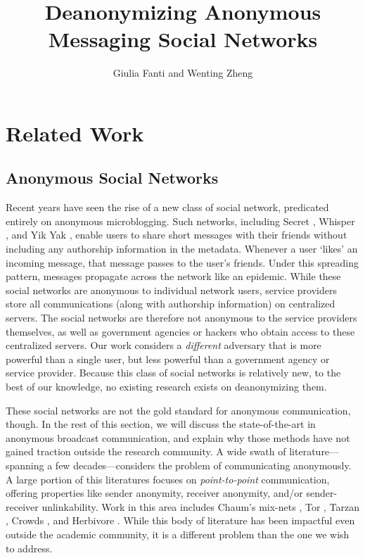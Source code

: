 \documentclass[10pt, twocolumn]{article}
\begin{document}
\title{Deanonymizing Anonymous Messaging Social Networks}

\author{Giulia Fanti and Wenting Zheng}

   \date{}
   \maketitle
   \thispagestyle{empty}
\section{Related Work}

\subsection{Anonymous Social Networks} 
Recent years have seen the rise of a new class of social network, predicated entirely on anonymous microblogging.
Such networks, including Secret \cite{secret}, Whisper \cite{whisper}, and Yik Yak \cite{yikyak}, enable users to share short messages with their friends without including any authorship information in the metadata. 
Whenever a user `likes' an incoming message, that message passes to the user's friends.
Under this spreading pattern, messages propagate across the network like an epidemic.
While these social networks are anonymous to individual network users, service providers store all communications (along with authorship information) on centralized servers.
The social networks are therefore not anonymous to the service providers themselves, as well as government agencies or hackers who obtain access to these centralized servers.
Our work considers a \emph{different} adversary that is more powerful than a single user, but less powerful than a government agency or service provider.
Because this class of social networks is relatively new, to the best of our knowledge, no existing research exists on deanonymizing them.

These social networks are not the gold standard for anonymous communication, though. In the rest of this section, we will discuss the state-of-the-art in anonymous broadcast communication, and explain why those methods have not gained traction outside the research community.
A wide swath of literature---spanning a few decades---considers the problem of communicating anonymously.
A large portion of this literatures focuses on \emph{point-to-point} communication, offering properties like sender anonymity, receiver anonymity, and/or sender-receiver unlinkability. 
Work in this area includes Chaum's mix-nets \cite{chaum1981untraceable}, Tor \cite{tor}, Tarzan \cite{tarzan}, Crowds \cite{reiter1998crowds}, and Herbivore \cite{goel2003herbivore}.
While this body of literature has been impactful even outside the academic community, it is a different problem than the one we wish to address.
\end{document}
